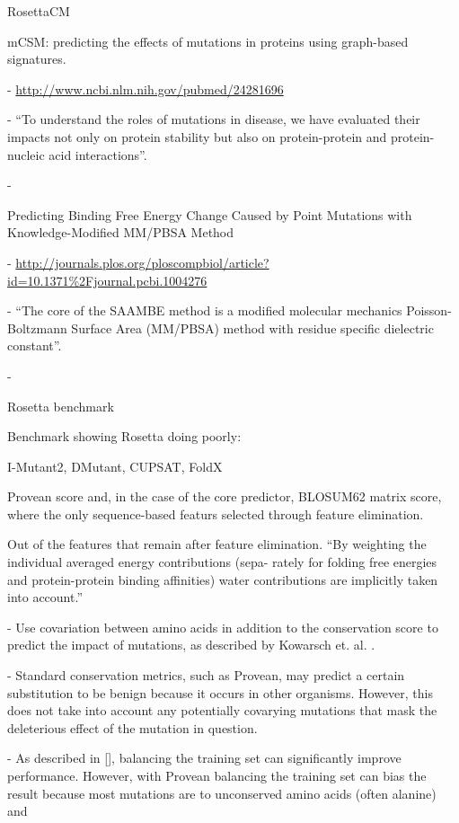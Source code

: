 RosettaCM

mCSM: predicting the effects of mutations in proteins using graph-based signatures.

  - \url{http://www.ncbi.nlm.nih.gov/pubmed/24281696}

  - ``To understand the roles of mutations in disease, we have evaluated their impacts not only on protein stability but also on protein-protein and protein-nucleic acid interactions''.

  - \cite{pires_mcsm:_2014}


Predicting Binding Free Energy Change Caused by Point Mutations with Knowledge-Modified MM/PBSA Method

  - \url{http://journals.plos.org/ploscompbiol/article?id=10.1371%2Fjournal.pcbi.1004276}

  - ``The core of the SAAMBE method is a modified molecular mechanics Poisson-Boltzmann Surface Area (MM/PBSA) method with residue specific dielectric constant''.

  - \cite{petukh_predicting_2015}




Rosetta benchmark \cite{o_conchuir_web_2015}

Benchmark showing Rosetta doing poorly: \cite{potapov_assessing_2009}

I-Mutant2, DMutant, CUPSAT, FoldX \cite{khan_performance_2010}


Provean score and, in the case of the core predictor, BLOSUM62 matrix score, where the only sequence-based featurs selected through feature elimination.

Out of the features that remain after feature elimination.
``By weighting the individual averaged energy contributions (sepa-
rately for folding free energies and protein-protein binding affinities)
water contributions are implicitly taken into account.''


- Use covariation between amino acids in addition to the conservation score to predict the impact of mutations, as described by Kowarsch et. al. \cite{kowarsch_correlated_2010}.

- Standard conservation metrics, such as Provean, may predict a certain substitution to be benign because it occurs in other organisms. However, this does not take into account any potentially covarying mutations that mask the deleterious effect of the mutation in question.

- As described in [], balancing the training set can significantly improve performance. However, with Provean balancing the training set can bias the result because most mutations are to unconserved amino acids (often alanine) and


